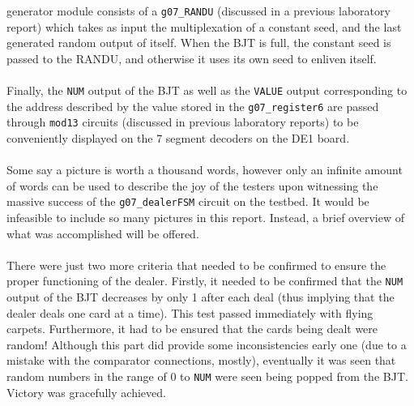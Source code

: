 \documentclass[12pt]{report}
\begin{document}
generator module consists
of a \texttt{g07\_RANDU} (discussed in a previous laboratory report) which takes as input the
multiplexation of a constant seed, and the last generated random output of itself. When the BJT is
full, the constant seed is passed to the RANDU, and otherwise it uses its own seed to enliven
itself.\\\\
Finally, the \texttt{NUM} output of the BJT as well as the \texttt{VALUE} output corresponding to
the address described by the value stored in the \texttt{g07\_register6} are passed through
\texttt{mod13} circuits (discussed in previous laboratory reports) to be conveniently displayed on
the 7 segment decoders on the DE1 board.\\\\
Some say a picture is worth a thousand words, however only an infinite amount of words can be used
to describe the joy of the testers upon witnessing the massive success of the
\texttt{g07\_dealerFSM} circuit on the testbed. It would be infeasible to include so many pictures
in this report. Instead, a brief overview of what was accomplished will be offered.\\\\
There were just two more criteria that needed to be confirmed to ensure the proper functioning of
the dealer. Firstly, it needed to be confirmed that the \texttt{NUM} output of the BJT decreases by
only 1 after each deal (thus implying that the dealer deals one card at a time). This test passed
immediately with flying carpets. Furthermore, it had to be ensured that the cards being dealt were
random! Although this part did provide some inconsistencies early one (due to a mistake with the
comparator connections, mostly), eventually it was seen that random numbers in the range of 0 to
\texttt{NUM} were seen being popped from the BJT. Victory was gracefully achieved.
\end{document}
